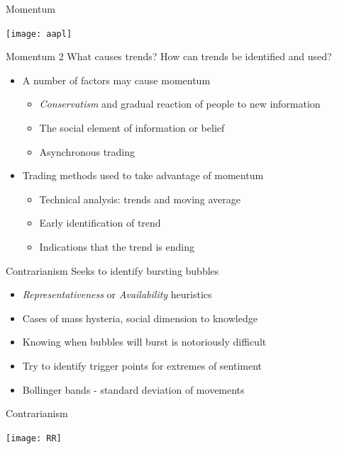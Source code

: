 \documentclass[14pt,xcolor=pdftex,dvipsnames,table]{beamer}\usepackage[]{graphicx}\usepackage[]{color}
\begin{document}
\begin{frame}{Momentum}
\begin{center}
\texttt{[image: aapl]}
\end{center}
\end{frame}

\begin{frame}{Momentum 2}
What causes trends?  How can trends be identified and used?  
\pause
\begin{itemize}[<+-| alert@+>]
\item A number of factors may cause momentum
\begin{itemize}
\item \emph{Conservatism} and gradual reaction of people to new information
\item The social element of information or belief
\item Asynchronous trading
\end{itemize}
\item Trading methods used to take advantage of momentum
\begin{itemize}
\item Technical analysis:  trends and moving average
\item Early identification of trend
\item Indications that the trend is ending
\end{itemize}
\end{itemize}
\end{frame}

\begin{frame}{Contrarianism}
Seeks to identify bursting bubbles
\begin{itemize}[<+-| alert@+>]
\item \emph{Representativeness} or \emph{Availability} heuristics
\item Cases of mass hysteria, social dimension to knowledge
\item Knowing when bubbles will burst is notoriously difficult
\item Try to identify trigger points for extremes of sentiment
\item Bollinger bands - standard deviation of movements
\end{itemize}
\end{frame}

\begin{frame}{Contrarianism}
\begin{center}
\texttt{[image: RR]}
\end{center}
\end{frame}
\end{document}
